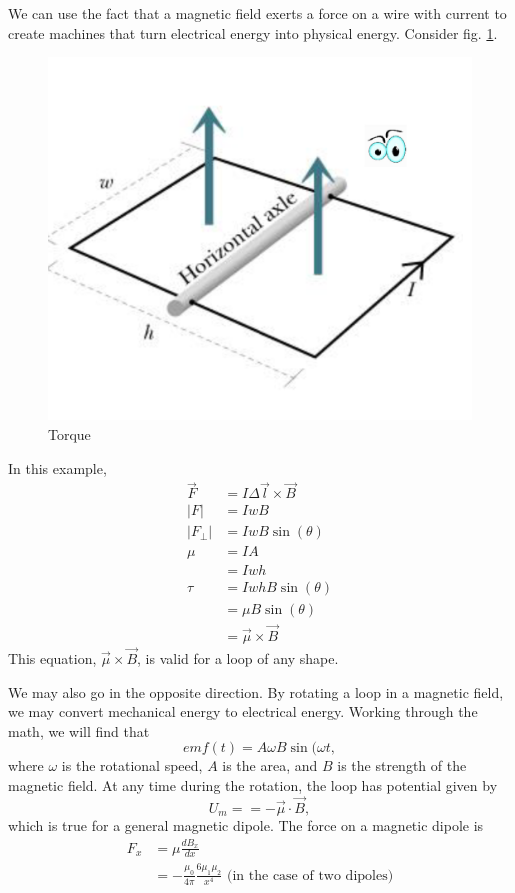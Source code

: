 \documentclass[nobib]{tufte-handout}
\begin{document}
We can use the fact that a magnetic field exerts a force 
on a wire with current to create machines that turn electrical energy into 
physical energy. Consider fig. \ref{fig:magtorque}. 
\begin{figure}
    \center 
    \caption{Torque}
    \label{fig:magtorque}
    \includegraphics{images/Screenshot 2023-11-06 100829.png}
\end{figure}
In this example, 
\begin{align*}
    \vec{F} &= I\Delta \vec{l} \times \vec{B} \\
    |F| &= IwB \\
    |F_{\perp}| &= IwB\sin(\theta) \\
    \mu &= IA \\
    &= Iwh \\
    \tau &= IwhB\sin(\theta) \\
    &= \mu B \sin(\theta) \\
    &= \vec{\mu} \times \vec{B}
\end{align*}
This equation, $\vec{\mu} \times \vec{B}$, is valid for a loop of any shape. 

We may also go in the opposite direction. By rotating a loop in a magnetic field, 
we may convert mechanical energy to electrical energy. Working through the math, 
we will find that 
\[emf(t) = A\omega B \sin(\omega t,\]
where $\omega$ is the rotational speed, $A$ is the area, and $B$ is the strength of 
the magnetic field. At any time during the rotation, the loop has potential given by 
\[U_m = =-\vec{\mu} \cdot \vec{B},\]
which is true for a general magnetic dipole. The force on a magnetic dipole 
is 
\begin{align*}
    F_x &= \mu \frac{dB_x}{dx} \\
    &= -\frac{\mu_0}{4 \pi} \frac{6 \mu_1 \mu_2}{x^4} \text{ (in the case of two dipoles)}
\end{align*}
\end{document}
